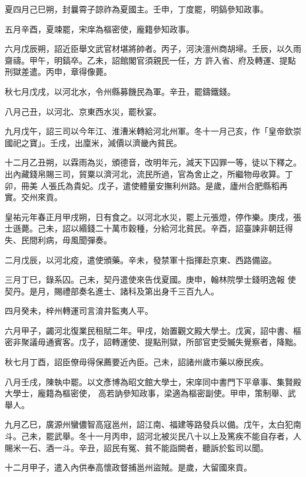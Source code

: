 \begin{pinyinscope}
 夏四月己巳朔，封曩霄子諒祚為夏國主。壬申，丁度罷，明鎬參知政事。



 五月辛酉，夏竦罷，宋庠為樞密使，龐籍參知政事。



 六月戊辰朔，詔近臣舉文武官材堪將帥者。丙子，河決澶州商胡埽。壬辰，以久雨齋禱。甲午，明鎬卒。乙未，詔館閣官須親民一任，方
 許入省、府及轉運、提點刑獄差遣。丙申，章得像薨。



 秋七月戊戌，以河北水，令州縣募饑民為軍。辛丑，罷鑄鐵錢。



 八月己丑，以河北、京東西水災，罷秋宴。



 九月戊午，詔三司以今年江、淮漕米轉給河北州軍。冬十一月己亥，作「皇帝欽崇國祀之寶」。壬戌，出廩米，減價以濟畿內貧民。



 十二月乙丑朔，以霖雨為災，頒德音，改明年元，減天下囚罪一等，徒以下釋之。出內藏錢帛賜三司，貿粟以濟河北，流民所過，官為舍止之，所繼物毋收算。丁卯，冊美
 人張氏為貴妃。戊子，遣使體量安撫利州路。是歲，廬州合肥縣稻再實。交州來貢。



 皇祐元年春正月甲戌朔，日有食之。以河北水災，罷上元張燈，停作樂。庚戌，張士遜薨。己未，詔以緡錢二十萬市穀種，分給河北貧民。辛酉，詔臺諫非朝廷得失、民間利病，毋風聞彈奏。



 二月戊辰，以河北疫，遣使頒藥。辛未，發禁軍十指揮赴京東、西路備盜。



 三月丁巳，錄系囚。己未，契丹遣使來告伐夏國。庚申，翰林院學士錢明逸報
 使契丹。是月，賜禮部奏名進士、諸科及第出身千三百九人。



 四月癸未，梓州轉運司言淯井監夷人平。



 六月甲子，蠲河北復業民租賦二年。甲戌，始置觀文殿大學士。戊寅，詔中書、樞密非聚議毋通賓客。戊子，詔轉運使、提點刑獄，所部官吏受贓失覺察者，降黜。



 秋七月丁酉，詔臣僚毋得保薦要近內臣。己未，詔諸州歲市藥以療民疾。



 八月壬戌，陳執中罷。以文彥博為昭文館大學士，宋庠同中書門下平章事、集賢殿大學士，龐籍為樞密使，
 高若訥參知政事，梁適為樞密副使。甲申，策制舉、武舉人。



 九月乙巳，廣源州蠻儂智高寇邕州，詔江南、福建等路發兵以備。戊午，太白犯南斗。己未，罷武舉。冬十一月丙申，詔河北被災民八十以上及篤疾不能自存者，人賜米一石、酒一斗。辛丑，詔民有冤、貧不能詣闕者，聽訴於監司以聞。



 十二月甲子，遣入內供奉高懷政督捕邕州盜賊。是歲，大留國來貢。



\end{pinyinscope}